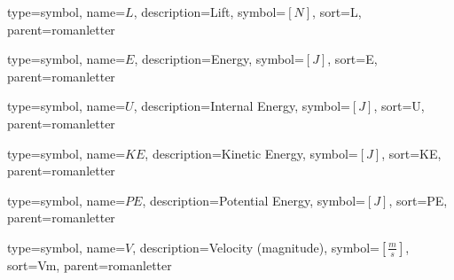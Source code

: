 {
type=symbol, %
name={\ensuremath{L}}, %
description={Lift}, %
symbol={$\left[N\right]$}, %
sort=L, %
parent=romanletter %
}

{
type=symbol, %
name={\ensuremath{E}}, %
description={Energy}, %
symbol={$\left[J\right]$}, %
sort=E, %
parent=romanletter %
}

{
type=symbol, %
name={\ensuremath{U}}, %
description={Internal Energy}, %
symbol={$\left[J\right]$}, %
sort=U, %
parent=romanletter %
}

{
type=symbol, %
name={\ensuremath{KE}}, %
description={Kinetic Energy}, %
symbol={$\left[J\right]$}, %
sort=KE, %
parent=romanletter %
}

{
type=symbol, %
name={\ensuremath{PE}}, %
description={Potential Energy}, %
symbol={$\left[J\right]$}, %
sort=PE, %
parent=romanletter %
}

{
type=symbol, %
name={\ensuremath{V}}, %
description={Velocity (magnitude)}, %
symbol={$\left[\frac{m}{s}\right]$}, %
sort=Vm, %
parent=romanletter %
}

